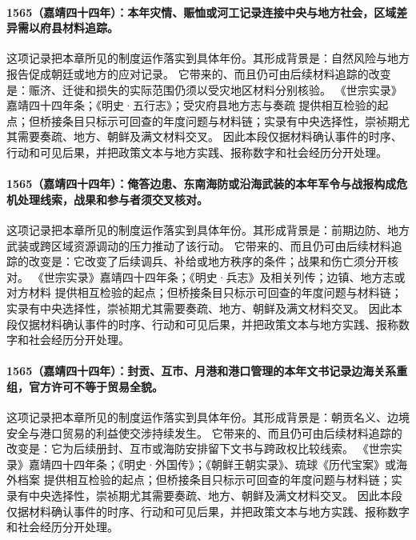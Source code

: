 \paragraph{1565（嘉靖四十四年）：本年灾情、赈恤或河工记录连接中央与地方社会，区域差异需以府县材料追踪。} 这项记录把本章所见的制度运作落实到具体年份。其形成背景是：自然风险与地方报告促成朝廷或地方的应对记录。 它带来的、而且仍可由后续材料追踪的改变是：赈济、迁徙和损失的实际范围仍须以受灾地区材料分别核验。 《世宗实录》嘉靖四十四年条；《明史·五行志》；受灾府县地方志与奏疏 提供相互检验的起点；但桥接条目只标示可回查的年度问题与材料链；实录有中央选择性，崇祯期尤其需要奏疏、地方、朝鲜及满文材料交叉。 因此本段仅据材料确认事件的时序、行动和可见后果，并把政策文本与地方实践、报称数字和社会经历分开处理。

\paragraph{1565（嘉靖四十四年）：俺答边患、东南海防或沿海武装的本年军令与战报构成危机处理线索，战果和参与者须交叉核对。} 这项记录把本章所见的制度运作落实到具体年份。其形成背景是：前期边防、地方武装或跨区域资源调动的压力推动了该行动。 它带来的、而且仍可由后续材料追踪的改变是：它改变了后续调兵、补给或地方秩序的条件；战果和伤亡须分开核对。 《世宗实录》嘉靖四十四年条；《明史·兵志》及相关列传；边镇、地方志或对方材料 提供相互检验的起点；但桥接条目只标示可回查的年度问题与材料链；实录有中央选择性，崇祯期尤其需要奏疏、地方、朝鲜及满文材料交叉。 因此本段仅据材料确认事件的时序、行动和可见后果，并把政策文本与地方实践、报称数字和社会经历分开处理。

\paragraph{1565（嘉靖四十四年）：封贡、互市、月港和港口管理的本年文书记录边海关系重组，官方许可不等于贸易全貌。} 这项记录把本章所见的制度运作落实到具体年份。其形成背景是：朝贡名义、边境安全与港口贸易的利益使交涉持续发生。 它带来的、而且仍可由后续材料追踪的改变是：它为后续册封、互市或海防安排留下文书与跨政权比较线索。 《世宗实录》嘉靖四十四年条；《明史·外国传》；《朝鲜王朝实录》、琉球《历代宝案》或海外档案 提供相互检验的起点；但桥接条目只标示可回查的年度问题与材料链；实录有中央选择性，崇祯期尤其需要奏疏、地方、朝鲜及满文材料交叉。 因此本段仅据材料确认事件的时序、行动和可见后果，并把政策文本与地方实践、报称数字和社会经历分开处理。

